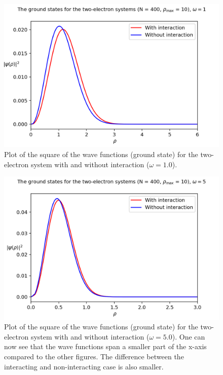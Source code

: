 \documentclass[10pt,a4paper,titlepage]{article}
\begin{document}
\begin{figure}[!h]
\centering
\caption{Plot of the square of the wave functions (ground state) for the two-electron system with and without interaction ($\omega = 1.0$).}
\label{fig:two_1}
\includegraphics[scale=0.6]{non_vs_int_two_e_1.png}
\end{figure}

\begin{figure}[!h]
\centering
\caption{Plot of the square of the wave functions (ground state) for the two-electron system with and without interaction ($\omega = 5.0$). One can now see that the wave functions span a smaller part of the x-axis compared to the other figures. The difference between the interacting and non-interacting case is also smaller.}
\label{fig:two_5}
\includegraphics[scale=0.6]{non_vs_int_two_e_5.png}
\end{figure}
\end{document}
